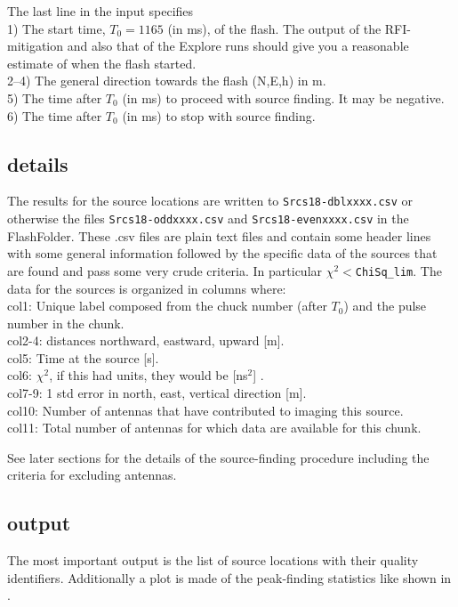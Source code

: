 The last line in the input specifies
\\1) The start time, $T_0=1165$  (in ms), of the flash. The output of the RFI-mitigation and also that of the Explore runs should give you a reasonable estimate of when the flash started.
\\2--4) The general direction towards the flash (N,E,h) in m.
\\5) The time after $T_0$ (in ms) to proceed with source finding. It may be negative.
\\6) The time after $T_0$ (in ms) to stop with source finding.

\subsection{details}

The results for the source locations are written to \verb!Srcs18-dblxxxx.csv! or otherwise the files \verb!Srcs18-oddxxxx.csv! and \verb!Srcs18-evenxxxx.csv! in the FlashFolder.
These .csv files are plain text files and contain some header lines with some general information followed by the specific data of the sources that are found and pass some very crude criteria. In particular $\chi^2<$\verb!ChiSq_lim!. The data for the sources is organized in columns where:
\\col1: Unique label composed from the chuck number (after $T_0$) and the pulse number in the chunk.
\\col2-4: distances northward, eastward, upward [m].
\\col5: Time at the source [s].
\\col6: $\chi^2$, if this had units, they would be [ns$^2$] .
\\col7-9: 1 std error in north, east, vertical direction [m].
\\col10: Number of antennas that have contributed to imaging this source.
\\col11: Total number of antennas for which data are available for this chunk.

See later sections for the details of the source-finding procedure including the criteria for excluding antennas.

\subsection{output}

The most important output is the list of source locations with their quality identifiers. Additionally a plot is made of the peak-finding statistics like shown in .

